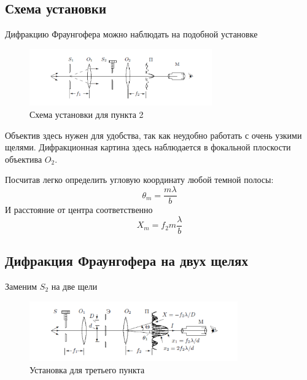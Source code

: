 \documentclass[a4paper]{article}
\begin{document}
\subsection*{Схема установки}
Дифракцию Фраунгофера можно наблюдать на подобной установке 

\begin{figure}[h]
\begin{center}
\includegraphics[width = 0.7\textwidth]{4.png}
\caption{Схема установки для пункта 2}
\end{center}
\end{figure}

Объектив здесь нужен для удобства, так как неудобно работать с очень узкими щелями. Дифракционная картина здесь наблюдается в фокальной плоскости объектива $O_2$. 

Посчитав легко определить угловую координату любой темной полосы:
\begin{equation}
\theta_m = \frac{m \lambda}{b}
\end{equation}
И расстояние от центра соответственно 
\begin{equation}
X_m = f_2m\frac{\lambda}{b}
\end{equation}

\subsection{Дифракция Фраунгофера на двух щелях}

Заменим $S_2$ на две щели 

\begin{figure}[h]
\begin{center}
\includegraphics[width = 0.8\textwidth]{5.png}
\caption{Установка для третьего пункта}
\end{center}
\end{figure}
\end{document}
